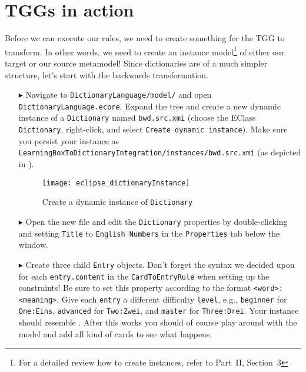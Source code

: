 \newpage
\section{TGGs in action}
\genHeader
\label{sect:TGGs_in_Action}

Before we can execute our rules, we need to create something for the TGG to transform. In other words, we need to create an instance model\footnote{For a
detailed review how to create instances, refer to Part~II, Section~3} of either our target or our source metamodel! Since dictionaries are
of a much simpler structure, let's start with the backwards transformation.

\begin{itemize}

\item[$\blacktriangleright$] Navigate to \texttt{Dictionary\-Language/model/} and open \texttt{Dictio\-nary\-Lang\-uage.ecore}. Expand the tree and create a new dynamic instance of a \texttt{Dictionary} named \texttt{bwd.src.xmi} (choose the EClass \texttt{Dictionary}, right-click, and select \texttt{Create dynamic instance}). 
Make sure you persist your instance as \texttt{Learn\-ing\-Box\-To\-Dictionary\-In\-te\-gra\-tion/in\-stan\-ces/bwd.src.xmi} (as depicted in ).

\begin{figure}[htbp]
\begin{center}
  \texttt{[image: eclipse\_dictionaryInstance]}
  \caption{Create a dynamic instance of \texttt{Dictionary}}
  \label{eclipse:create_instance_dict}
\end{center}
\end{figure}

\newpage

\item[$\blacktriangleright$] Open the new file and edit the \texttt{Dictionary} properties by double-clicking and setting \texttt{Title} to \texttt{English Numbers} in the \texttt{Properties} tab below the window.

\vspace{0.5cm}

\item[$\blacktriangleright$] Create three child \texttt{Entry} objects.
Don't forget the syntax we decided upon for each \texttt{entry.content} in the \texttt{CardToEntryRule} when setting up the constraints! 
Be sure to set this property according to the format \texttt{<word>:<meaning>}. 
Give each \texttt{entry} a different difficulty \texttt{level}, e.g., \texttt{beginner} for \texttt{One:Eins}, \texttt{advanced} for \texttt{Two:Zwei}, and \texttt{master} for \texttt{Three:Drei}.
Your instance should resemble .
After this works you should of course play around with the model and add all kind of cards to see what happens.


\end{itemize}
